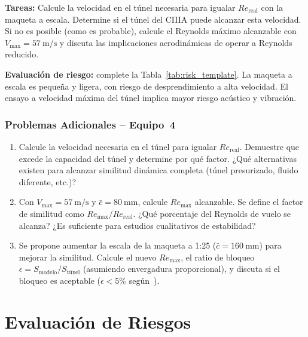 \documentclass[12pt,a4paper]{article}
\begin{document}
\textbf{Tareas:} Calcule la velocidad en el túnel necesaria para igualar
$Re_\mathrm{real}$ con la maqueta a escala.  Determine si el túnel del CIIIA
puede alcanzar esta velocidad.  Si no es posible (como es probable), calcule
el Reynolds máximo alcanzable con $V_\mathrm{max} = \SI{57}{\m\per\s}$ y
discuta las implicaciones aerodinámicas de operar a Reynolds reducido.

\textbf{Evaluación de riesgo:} complete la Tabla~\ref{tab:risk_template}.
La maqueta a escala es pequeña y ligera, con riesgo de desprendimiento a alta
velocidad.  El ensayo a velocidad máxima del túnel implica mayor riesgo
acústico y vibración.

\subsubsection*{Problemas Adicionales -- Equipo~4}

\begin{enumerate}
	\item[\textbf{P4.1}] Calcule la velocidad necesaria en el túnel para igualar
	      $Re_\mathrm{real}$.  Demuestre que excede la capacidad del túnel y
	      determine por qué factor.  ¿Qué alternativas existen para alcanzar
	      similitud dinámica completa (túnel presurizado, fluido diferente, etc.)?

	\item[\textbf{P4.2}] Con $V_\mathrm{max} = \SI{57}{\m\per\s}$ y
	      $\bar{c} = \SI{80}{\mm}$, calcule $Re_\mathrm{max}$ alcanzable.
	      Se define el factor de similitud como $Re_\mathrm{max}/Re_\mathrm{real}$.
	      ¿Qué porcentaje del Reynolds de vuelo se alcanza?  ¿Es suficiente para
	      estudios cualitativos de estabilidad?

	\item[\textbf{P4.3}] Se propone aumentar la escala de la maqueta a 1:25
	      ($\bar{c} = \SI{160}{\mm}$) para mejorar la similitud.  Calcule el nuevo
	      $Re_\mathrm{max}$, el ratio de bloqueo $\epsilon = S_\mathrm{modelo} /
		      S_\mathrm{túnel}$ (asumiendo envergadura proporcional), y discuta si el
	      bloqueo es aceptable ($\epsilon < 5\%$ según~\cite{barlow1999}).
\end{enumerate}

\section{Evaluación de Riesgos}
\label{sec:riesgos}
\end{document}
